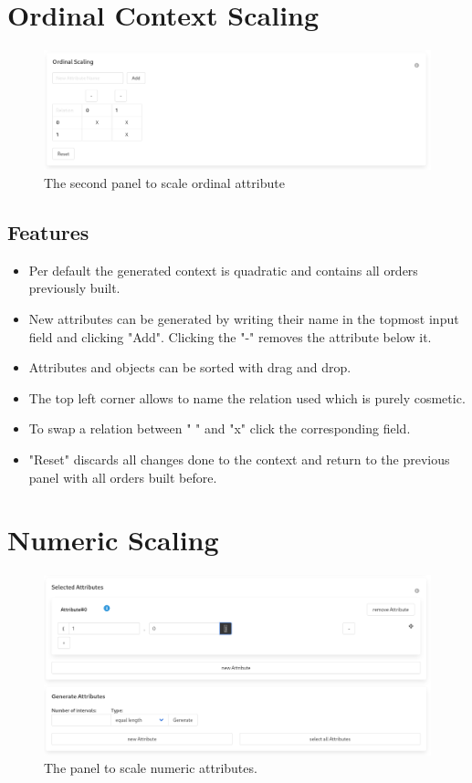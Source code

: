 \documentclass[]{article}
\begin{document}
\section{Ordinal Context Scaling}
\begin{figure}[H]
	\includegraphics[width=\linewidth]{images/ordinal_ctx.png}
	\caption{The second panel to scale ordinal attribute}
	\label{fig:p6}
\end{figure}
\subsection{Features}
\begin{itemize}
    \item Per default the generated context is quadratic and contains all orders previously built.
    \item New attributes can be generated by writing their name in the topmost input field and clicking "Add". Clicking the "-" removes the attribute below it.
    \item Attributes and objects can be sorted with drag and drop.
    \item The top left corner allows to name the relation used which is purely cosmetic.
    \item To swap a relation between " " and "x" click the corresponding field.
    \item "Reset" discards all changes done to the context and return to the previous panel with all orders built before.
\end{itemize}

\section{Numeric Scaling}
\begin{figure}[H]
	\includegraphics[width=\linewidth]{images/numeric.png}
	\caption{The panel to scale numeric attributes.}
	\label{fig:p7}
\end{figure}
\end{document}

